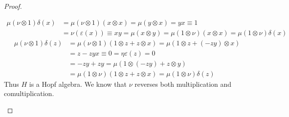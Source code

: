 \documentclass[8pt]{article}
\theoremstyle{definition}
\theoremstyle{definition}
\theoremstyle{definition}
\theoremstyle{definition}
\theoremstyle{definition}
\theoremstyle{definition}
\theoremstyle{definition}
\theoremstyle{definition}
\theoremstyle{definition}
\theoremstyle{definition}
\theoremstyle{definition}
\theoremstyle{definition}
\theoremstyle{definition}
\theoremstyle{definition}
\theoremstyle{question}
\begin{document}
\begin{proof}
\begin{enumerate}
\begin{align*}
      \mu (\nu \otimes 1) \delta(x) &= \mu (\nu \otimes 1) (x \otimes x) = \mu (y \otimes x) = y x \equiv 1 \\
      &= \nu (\varepsilon (x)) \equiv xy = \mu(x \otimes y) = \mu (1 \otimes \nu)(x \otimes x) = \mu (1 \otimes \nu) \delta(x)
    \end{align*}
    \begin{align*}
      \mu (\nu \otimes 1) \delta(z) &= \mu (\nu \otimes 1) (1 \otimes z + z \otimes x) = \mu (1 \otimes z + (- zy) \otimes x) \\
      &= z - zyx \equiv 0 = \eta \varepsilon(z) = 0 \\
      &= -zy + zy = \mu (1 \otimes (-zy) + z \otimes y) \\
      &= \mu (1 \otimes \nu) (1 \otimes z + z \otimes x) =  \mu (1 \otimes \nu) \delta(z)
    \end{align*}
    Thus $H$ is a Hopf algebra. We know that $\nu$ reverses both multiplication and comultiplication.


\end{enumerate}
\end{proof}
\end{document}
